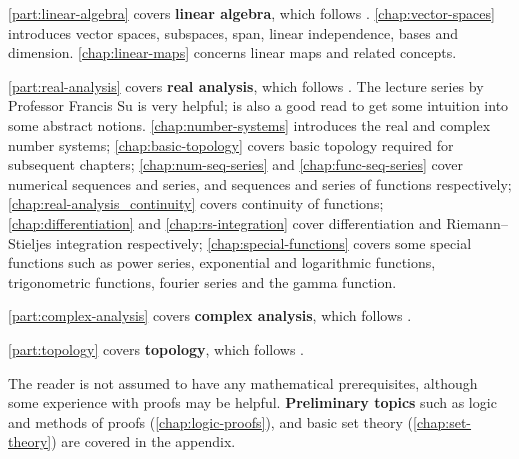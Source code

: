 \iflinalg
\cref{part:linear-algebra} covers \textbf{linear algebra}, which follows \cite{axler}. \cref{chap:vector-spaces} introduces vector spaces, subspaces, span, linear independence, bases and dimension. \cref{chap:linear-maps} concerns linear maps and related concepts.
\fi

\ifranalysis
\cref{part:real-analysis} covers \textbf{real analysis}, which follows \cite{rudin,apostol,bartle-sherbert}. The lecture series by Professor Francis Su is very helpful; \cite{alcock} is also a good read to get some intuition into some abstract notions. \cref{chap:number-systems} introduces the real and complex number systems; \cref{chap:basic-topology} covers basic topology required for subsequent chapters; \cref{chap:num-seq-series} and \cref{chap:func-seq-series} cover numerical sequences and series, and sequences and series of functions respectively; \cref{chap:real-analysis_continuity} covers continuity of functions; \cref{chap:differentiation} and \cref{chap:rs-integration} cover differentiation and Riemann--Stieljes integration respectively; \cref{chap:special-functions} covers some special functions such as power series, exponential and logarithmic functions, trigonometric functions, fourier series and the gamma function.
\fi

\ifcanalysis
\cref{part:complex-analysis} covers \textbf{complex analysis}, which follows \cite{ahlfors,lang}.
\fi

\iftop
\cref{part:topology} covers \textbf{topology}, which follows \cite{munkres}.
\fi

\ifprelim
The reader is not assumed to have any mathematical prerequisites, although some experience with proofs may be helpful. \textbf{Preliminary topics} such as logic and methods of proofs (\cref{chap:logic-proofs}), and basic set theory (\cref{chap:set-theory}) are covered in the appendix.
\fi

